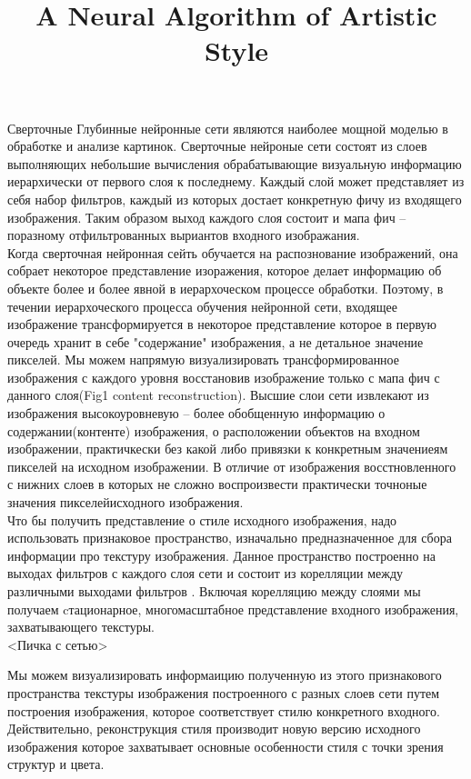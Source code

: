 \documentclass{article}
\title{\vspace{-2em}A Neural Algorithm of Artistic Style}
\date{}
\begin{document}
\maketitle

Сверточные Глубинные нейронные сети являются наиболее мощной моделью в обработке и анализе картинок. Сверточные нейроные сети состоят из слоев выполняющих небольшие вычисления обрабатывающие визуальную информацию иерархически от первого слоя к последнему. Каждый слой может представляет из себя набор фильтров, каждый из которых достает конкретную фичу из входящего изображения. Таким образом выход каждого слоя состоит и мапа фич -- поразному отфильтрованных выриантов входного изображания.\\



Когда сверточная нейронная сейть обучается на распознование изображений, она собрает некоторое представление изоражения, которое делает информацию об объекте более и более явной в иерархоческом процессе обработки. Поэтому, в течении иерархоческого процесса обучения нейронной сети, входящее изображение трансформируется в некоторое представление которое в первую очередь хранит в себе "содержание" изображения, а не детальное значение пикселей. Мы  можем напрямую визуализировать трансформированное изображения с каждого уровня восстановив изображение только с мапа фич с данного слоя(Fig1 content reconstruction). Высшие слои сети извлекают из изображения высокоуровневую -- более обобщенную информацию о содержании(контенте) изображения, о расположении объектов на входном изображении, практичкески без какой либо привязки к конкретным значениеям пикселей на исходном изображении. В отличие от изображения восстновленного с нижних слоев в которых не сложно воспроизвести практически точноные значения пикселейисходного изображения.\\


Что бы получить представление о стиле исходного изображения, надо использовать признаковое пространство, изначально предназначенное для сбора информации про текстуру изображения. Данное пространство построенно на выходах фильтров с каждого слоя сети и состоит из корелляции между различными выходами фильтров . Включая корелляцию между слоями мы получаем cтационарное, многомасштабное представление входного изображения, захватывающего текстуры.\\


<Пичка с сетью>


Мы можем визуализировать информаицию полученную из этого признакового пространства текстуры изображения построенного с разных слоев сети путем построения изображения, которое соответствует стилю конкретного входного. Действительно, реконструкция стиля производит новую версию исходного изображения которое захватывает основные особенности стиля с точки зрения структур и цвета.
\end{document}
